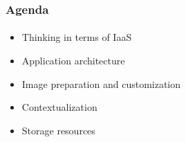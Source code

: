 \begin{frame}
\frametitle{Agenda}
\framesubtitle{}
\begin{itemize}
\item Thinking in terms of IaaS
\item Application architecture
\item Image preparation and customization
\item Contextualization
\item Storage resources
\end{itemize}
\end{frame}

